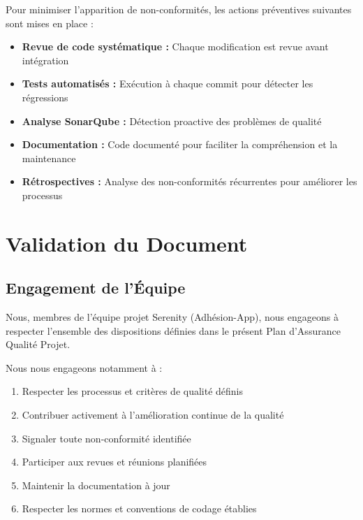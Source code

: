 \documentclass[12pt,a4paper]{report}
\begin{document}
Pour minimiser l'apparition de non-conformités, les actions préventives suivantes sont mises en place :

\begin{itemize}
    \item \textbf{Revue de code systématique :} Chaque modification est revue avant intégration
    \item \textbf{Tests automatisés :} Exécution à chaque commit pour détecter les régressions
    \item \textbf{Analyse SonarQube :} Détection proactive des problèmes de qualité
    \item \textbf{Documentation :} Code documenté pour faciliter la compréhension et la maintenance
    \item \textbf{Rétrospectives :} Analyse des non-conformités récurrentes pour améliorer les processus
\end{itemize}

\newpage

\chapter*{Validation du Document}

\section*{Engagement de l'Équipe}

Nous, membres de l'équipe projet Serenity (Adhésion-App), nous engageons à respecter l'ensemble des dispositions définies dans le présent Plan d'Assurance Qualité Projet.

Nous nous engageons notamment à :
\begin{enumerate}
    \item Respecter les processus et critères de qualité définis
    \item Contribuer activement à l'amélioration continue de la qualité
    \item Signaler toute non-conformité identifiée
    \item Participer aux revues et réunions planifiées
    \item Maintenir la documentation à jour
    \item Respecter les normes et conventions de codage établies
\end{enumerate}
\end{document}
